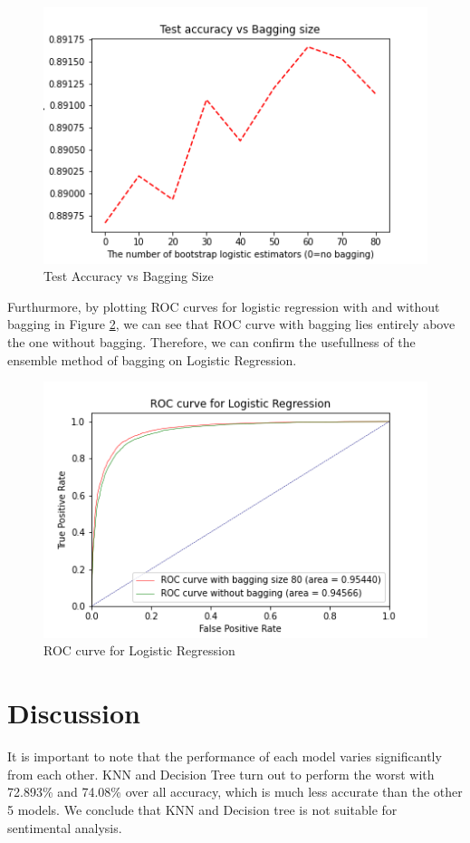 \documentclass[10pt,twocolumn,letterpaper]{article}
\begin{document}
	\begin{figure}[H]
		\includegraphics[width=\columnwidth]{Logistic_bagging}
		\caption{Test Accuracy vs Bagging Size}\label{Logistic_bagging}
	\end{figure} 	
	Furthurmore, by plotting ROC curves for logistic regression with and without bagging in Figure \ref{ROCComparsion}, we can see that ROC curve with bagging lies entirely above the one without bagging. Therefore, we can confirm the usefullness of the ensemble method of bagging on Logistic Regression.
	
	\begin{figure}[htbp]
		\includegraphics[width=\columnwidth]{ROCComparsion}
		\caption{ROC curve for Logistic Regression}\label{ROCComparsion}
	\end{figure} 	
	\section{Discussion}
	It is important to note that the performance of each model varies significantly from each other. KNN and Decision Tree turn out to perform the worst with 72.893\% and 74.08\% over all accuracy, which is much less accurate than the other 5 models. We conclude that KNN and Decision tree is not suitable for sentimental analysis. 
	
\end{document}
